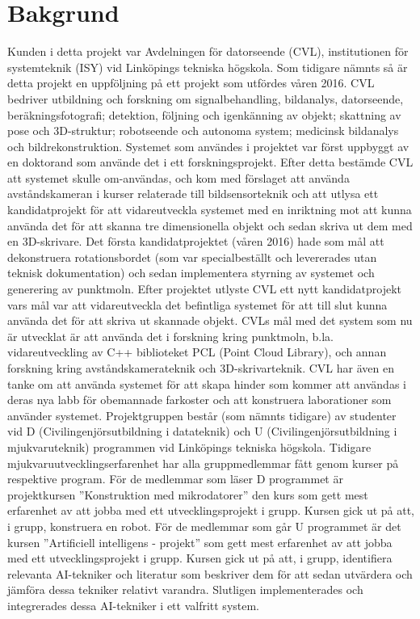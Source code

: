 \chapter{Bakgrund}
\label{cha:background}


Kunden i detta projekt var Avdelningen för datorseende (CVL), institutionen för systemteknik (ISY) vid Linköpings tekniska högskola. Som tidigare nämnts så är detta projekt en uppföljning på ett projekt som utfördes våren 2016. 
CVL bedriver utbildning och forskning om signalbehandling, bildanalys, datorseende, beräkningsfotografi; detektion, följning och igenkänning av objekt; skattning av pose och 3D-struktur; robotseende och autonoma system; medicinsk bildanalys och bildrekonstruktion. Systemet som användes i projektet var först uppbyggt av en doktorand som använde det i ett forskningsprojekt. Efter detta bestämde CVL att systemet skulle om-användas, och kom med förslaget att använda avståndskameran i kurser relaterade till bildsensorteknik och att utlysa ett kandidatprojekt för att vidareutveckla systemet med en inriktning mot att kunna använda det för att skanna tre dimensionella objekt och sedan skriva ut dem med en 3D-skrivare. Det första kandidatprojektet (våren 2016) hade som mål att dekonstruera rotationsbordet (som var specialbeställt och levererades utan teknisk dokumentation) och sedan implementera styrning av systemet och generering av punktmoln. Efter projektet utlyste CVL ett nytt kandidatprojekt vars mål var att vidareutveckla det befintliga systemet för att till slut kunna använda det för att skriva ut skannade objekt.
CVLs mål med det system som nu är utvecklat är att använda det i forskning kring punktmoln, b.la. vidareutveckling av C++ biblioteket PCL (Point Cloud Library), och annan forskning kring avståndskamerateknik och 3D-skrivarteknik. CVL har även en tanke om att använda systemet för att skapa hinder som kommer att användas i deras nya labb för obemannade farkoster och att konstruera laborationer som använder systemet.
Projektgruppen består (som nämnts tidigare) av studenter vid D (Civilingenjörsutbildning i datateknik) och U (Civilingenjörsutbildning i mjukvaruteknik) programmen vid Linköpings tekniska högskola. Tidigare mjukvaruutvecklingserfarenhet har alla gruppmedlemmar fått genom kurser på respektive program. För de medlemmar som läser D programmet är projektkursen ”Konstruktion med mikrodatorer” den kurs som gett mest erfarenhet av att jobba med ett utvecklingsprojekt i grupp. Kursen gick ut på att, i grupp, konstruera en robot. För de medlemmar som går U programmet är det kursen ”Artificiell intelligens - projekt” som gett mest erfarenhet av att jobba med ett utvecklingsprojekt i grupp. Kursen gick ut på att, i grupp, identifiera relevanta AI-tekniker och literatur som beskriver dem för att sedan utvärdera och jämföra dessa tekniker relativt varandra. Slutligen implementerades och integrerades dessa AI-tekniker i ett valfritt system.

